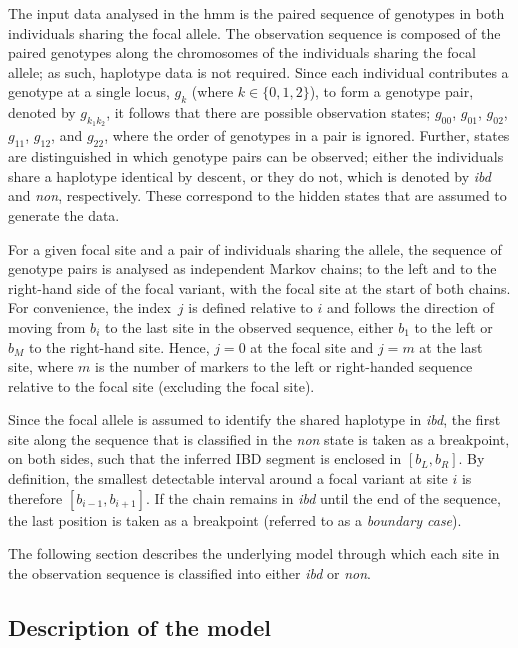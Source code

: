 The input data analysed in the \gls{hmm} is the paired sequence of genotypes in both individuals sharing the focal allele.
The observation sequence is composed of the paired genotypes along the chromosomes of the  individuals sharing the focal allele; as such, haplotype data is not required.
Since each individual contributes a genotype at a single locus, $g_k$ (where ${k \in \lbrace 0,1,2 \rbrace}$), to form a genotype pair, denoted by $g_{k_1 k_2}$, it follows that there are  possible observation states; $g_{00}$, $g_{01}$, $g_{02}$, $g_{11}$, $g_{12}$, and $g_{22}$, where the order of genotypes in a pair is ignored.
Further,  states are distinguished in which genotype pairs can be observed; either the  individuals share a haplotype identical by descent, or they do not, which is denoted by \emph{ibd} and \emph{non}, respectively.
These correspond to the hidden states that are assumed to generate the data.

For a given focal site and a pair of individuals sharing the allele, the sequence of genotype pairs is analysed as  independent Markov chains; \ie {} to the left and  to the right-hand side of the focal variant, with the focal site at the start of both chains.
For convenience, the index~$j$ is defined relative to $i$ and follows the direction of moving from $b_i$ to the last site in the observed sequence, either $b_1$ to the left or $b_M$ to the right-hand site.
Hence, ${j=0}$ at the focal site and ${j = m}$ at the last site, where $m$ is the number of markers to the left or right-handed sequence relative to the focal site (excluding the focal site).

Since the focal allele is assumed to identify the shared haplotype in \emph{ibd}, the first site along the sequence that is classified in the \emph{non} state is taken as a breakpoint, on both sides, such that the inferred IBD segment is enclosed in ${[b_L, b_R]}$.
By definition, the smallest detectable interval around a focal variant at site $i$ is therefore ${[b_{i-1}, b_{i+1}]}$.
If the chain remains in \emph{ibd} until the end of the sequence, the last position is taken as a breakpoint (referred to as a \emph{boundary case}).

The following section describes the underlying model through which each site in the observation sequence is classified into either \emph{ibd} or \emph{non}.


%
\subsection{Description of the model}
%

